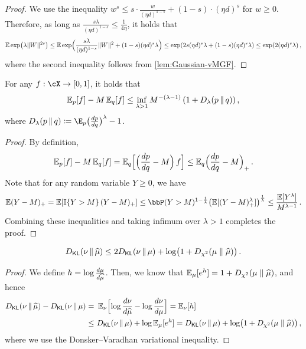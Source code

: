 \begin{proof}
We use the inequality $w^s\leq s\cdot\frac{w}{(\eta d)^{1-s}}+(1-s)\cdot (\eta d)^s$ for $w\geq 0$. Therefore, as long as $\frac{s\lambda}{(\eta d)^{1-s}}\leq \frac{1}{4\eta}$, it holds that
\begin{align*}
    \En\exp\prn*{\lambda\nrm{W}^{2s}}
    \leq \En\exp\prn[\Big]{\frac{s\lambda}{(\eta d)^{1-s}}\nrm{W}^{2}+(1-s)(\eta d)^s\lambda }
    \leq \exp\prn*{2s(\eta d)^s\lambda+(1-s)(\eta d)^s\lambda }
    \leq \exp\prn*{2(\eta d)^s \lambda}\,,
\end{align*}
where the second inequality follows from \cref{lem:Gaussian-vMGF}.
\end{proof}

\begin{lemma}\label{lem:Renyi-to-cov}
For any $f:\cX\to [0,1]$, it holds that
\begin{align*}
    \En_{p}[f]-M\En_q[f]\leq \inf_{\lambda>1} M^{-(\lambda-1)}\,(1+\Dren{p}{q})\,,
\end{align*}
where $\Dren{p}{q} \deq \E_p\prn[\big]{\frac{dp}{dq}}^\lambda - 1$.
\end{lemma}

\begin{proof}
By definition,
\begin{align*}
    \En_{p}[f]-M\En_q[f]=\En_q\brk[\Big]{\prn[\Big]{\frac{dp}{dq}-M}\,f}
    \leq \En_q \prn[\Big]{\frac{dp}{dq}-M}_+\,.
\end{align*}
Note that for any random variable $Y\geq 0$, we have
\begin{align*}
    \En(Y-M)_+=\En[\indic{\{Y>M\}}\,(Y-M)_+]\leq \bbP(Y>M)^{1-\frac{1}{\lambda}}\prn*{\En[(Y-M)_+^\lambda]}^{\frac{1}{\lambda}}\leq \frac{\En[Y^\lambda]}{M^{\lambda-1}}\,.
\end{align*}
Combining these inequalities and taking infimum over $\lambda>1$ completes the proof.
\end{proof}

\begin{lemma}\label{lem:KL-triangle}

\begin{align*}
    \Dkl{\nu}{\muhat}\leq 2\Dkl{\nu}{\mu}+\log\prn*{1+\Dchis{\mu}{\muhat}}\,.
\end{align*}
\end{lemma}
\begin{proof}
We define $h=\log \frac{d\mu}{d\muhat}$. Then, we know that $\En_{\mu}[e^h]=1+\Dchis{\mu}{\muhat}$, and hence
\begin{align*}
    \Dkl{\nu}{\muhat}-\Dkl{\nu}{\mu}=&~\En_{\nu}\brk[\Big]{\log \frac{d\nu}{d\muhat}-\log \frac{d\nu}{d\mu}} 
    = \En_\nu[h] \\
    \leq&~ \Dkl{\nu}{\mu}+\log \En_{\mu}[e^{h}]
    =\Dkl{\nu}{\mu}+\log\prn*{1+\Dchis{\mu}{\muhat}}\,,
\end{align*}
where we use the Donsker--Varadhan variational inequality.
\end{proof}

